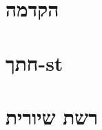 \documentclass[]{article}
\def\lecnum{11}
\def\insert#1{}
\def\stcut{חתך-\textenglish{st}}
\begin{document}
\def\topcis{
רשתות זרימה
}


\section*{הקדמה}
\insert{intro}

\section*{\stcut}
\insert{cuts}

\section*{רשת שיורית}
\insert{residual}
\end{document}
